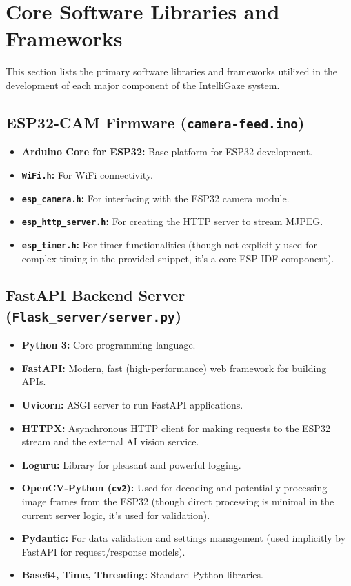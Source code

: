 \documentclass[12pt, a4paper]{report}
\begin{document}
\chapter{Core Software Libraries and Frameworks}
\label{app:libraries}
This section lists the primary software libraries and frameworks utilized in the development of each major component of the IntelliGaze system.

\section{ESP32-CAM Firmware (\texttt{camera-feed.ino})}
\begin{itemize}
    \item \textbf{Arduino Core for ESP32:} Base platform for ESP32 development.
    \item \textbf{\texttt{WiFi.h}:} For WiFi connectivity.
    \item \textbf{\texttt{esp\_camera.h}:} For interfacing with the ESP32 camera module.
    \item \textbf{\texttt{esp\_http\_server.h}:} For creating the HTTP server to stream MJPEG.
    \item \textbf{\texttt{esp\_timer.h}:} For timer functionalities (though not explicitly used for complex timing in the provided snippet, it's a core ESP-IDF component).
\end{itemize}

\section{FastAPI Backend Server (\texttt{Flask\_server/server.py})}
\begin{itemize}
    \item \textbf{Python 3:} Core programming language.
    \item \textbf{FastAPI:} Modern, fast (high-performance) web framework for building APIs.
    \item \textbf{Uvicorn:} ASGI server to run FastAPI applications.
    \item \textbf{HTTPX:} Asynchronous HTTP client for making requests to the ESP32 stream and the external AI vision service.
    \item \textbf{Loguru:} Library for pleasant and powerful logging.
    \item \textbf{OpenCV-Python (\texttt{cv2}):} Used for decoding and potentially processing image frames from the ESP32 (though direct processing is minimal in the current server logic, it's used for validation).
    \item \textbf{Pydantic:} For data validation and settings management (used implicitly by FastAPI for request/response models).
    \item \textbf{Base64, Time, Threading:} Standard Python libraries.
\end{itemize}
\end{document}

